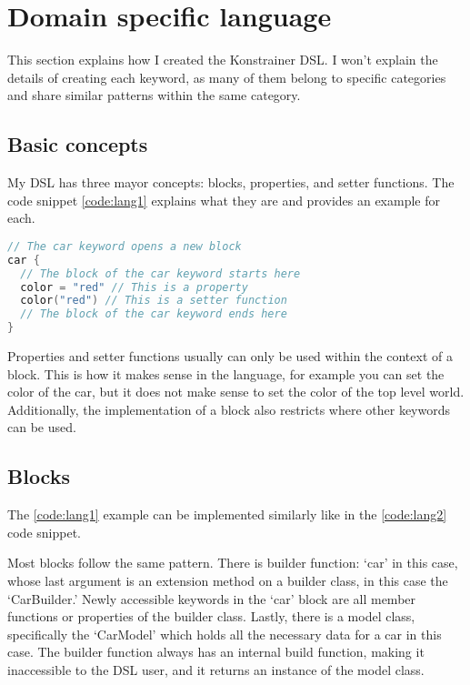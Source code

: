 \section{Domain specific language}
\label{sec:dsl}

This section explains how I created the Konstrainer DSL. I won't explain the details of creating each keyword, as many of them belong to specific categories and share similar patterns within the same category.

\subsection{Basic concepts}

My DSL has three mayor concepts: blocks, properties, and setter functions. The code snippet \ref{code:lang1} explains what they are and provides an example for each.

\begin{minipage}{\linewidth}
\begin{lstlisting}[caption={Language concepts},language=Kotlin,label=code:lang1]
// The car keyword opens a new block
car { 
  // The block of the car keyword starts here
  color = "red" // This is a property
  color("red") // This is a setter function
  // The block of the car keyword ends here
}
\end{lstlisting}
\end{minipage}

Properties and setter functions usually can only be used within the context of a block. This is how it makes sense in the language, for example you can set the color of the car, but it does not make sense to set the color of the top level world. Additionally, the implementation of a block also restricts where other keywords can be used.

\subsection{Blocks}
 
The \ref{code:lang1} example can be implemented similarly like in the \ref{code:lang2} code snippet.

Most blocks follow the same pattern. There is builder function: `car' in this case, whose last argument is an extension method on a builder class, in this case the `CarBuilder.' Newly accessible keywords in the `car' block are all member functions or properties of the builder class. Lastly, there is a model class, specifically the `CarModel' which holds all the necessary data for a car in this case. The builder function always has an internal build function, making it inaccessible to the DSL user, and it returns an instance of the model class.

